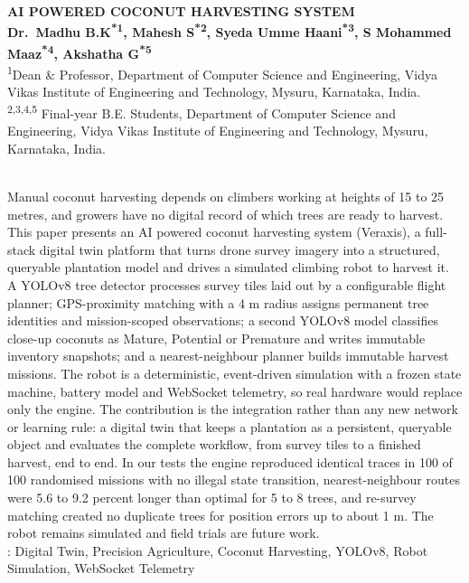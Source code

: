 \documentclass[10pt,a4paper]{article}
\begin{document}
\begin{center}
{\cambria\bfseries\fontsize{14}{17}\selectfont AI POWERED COCONUT HARVESTING SYSTEM}\\[10pt]
{\cambria\bfseries\fontsize{12}{14}\selectfont
Dr.~Madhu B.K\textsuperscript{*1}, Mahesh S\textsuperscript{*2}, Syeda Umme Haani\textsuperscript{*3}, S Mohammed Maaz\textsuperscript{*4}, Akshatha G\textsuperscript{*5}}\\[6pt]
{\cambria\fontsize{11}{13}\selectfont
\textsuperscript{1}Dean \& Professor, Department of Computer Science and Engineering, Vidya Vikas Institute of Engineering and Technology, Mysuru, Karnataka, India.}\\[2pt]
{\cambria\fontsize{11}{13}\selectfont
\textsuperscript{2,3,4,5} Final-year B.E. Students, Department of Computer Science and Engineering, Vidya Vikas Institute of Engineering and Technology, Mysuru, Karnataka, India.}
\end{center}

\vspace{2pt}
\\[2pt]
Manual coconut harvesting depends on climbers working at heights of 15 to 25 metres, and growers have no digital record of which trees are ready to harvest. This paper presents an AI powered coconut harvesting system (Veraxis), a full-stack digital twin platform that turns drone survey imagery into a structured, queryable plantation model and drives a simulated climbing robot to harvest it. A YOLOv8 tree detector processes survey tiles laid out by a configurable flight planner; GPS-proximity matching with a 4 m radius assigns permanent tree identities and mission-scoped observations; a second YOLOv8 model classifies close-up coconuts as Mature, Potential or Premature and writes immutable inventory snapshots; and a nearest-neighbour planner builds immutable harvest missions. The robot is a deterministic, event-driven simulation with a frozen state machine, battery model and WebSocket telemetry, so real hardware would replace only the engine. The contribution is the integration rather than any new network or learning rule: a digital twin that keeps a plantation as a persistent, queryable object and evaluates the complete workflow, from survey tiles to a finished harvest, end to end. In our tests the engine reproduced identical traces in 100 of 100 randomised missions with no illegal state transition, nearest-neighbour routes were 5.6 to 9.2 percent longer than optimal for 5 to 8 trees, and re-survey matching created no duplicate trees for position errors up to about 1 m. The robot remains simulated and field trials are future work.\\[4pt]
: Digital Twin, Precision Agriculture, Coconut Harvesting, YOLOv8, Robot Simulation, WebSocket Telemetry
\end{document}
